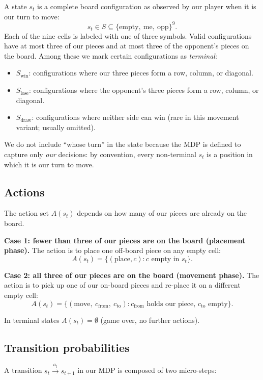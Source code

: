 \documentclass[12pt]{article}
\begin{document}
A state $s_t$ is a complete board configuration as observed by our player when it is our turn to move:
\[
  s_t \in S \subseteq \{\text{empty},\ \text{me},\ \text{opp}\}^9.
\]
Each of the nine cells is labeled with one of three symbols. Valid configurations have at most three of our pieces and at most three of the opponent's pieces on the board. Among these we mark certain configurations as \emph{terminal}:
\begin{itemize}[leftmargin=1.5em,itemsep=1pt]
  \item $S_{\text{win}}$: configurations where our three pieces form a row, column, or diagonal.
  \item $S_{\text{lose}}$: configurations where the opponent's three pieces form a row, column, or diagonal.
  \item $S_{\text{draw}}$: configurations where neither side can win (rare in this movement variant; usually omitted).
\end{itemize}
We do not include ``whose turn'' in the state because the MDP is defined to capture only \emph{our} decisions: by convention, every non-terminal $s_t$ is a position in which it is our turn to move.

\subsection*{Actions}

The action set $A(s_t)$ depends on how many of our pieces are already on the board.

\textbf{Case 1: fewer than three of our pieces are on the board (placement phase).} The action is to place one off-board piece on any empty cell:
\[
  A(s_t) = \{(\text{place}, c) : c \text{ empty in } s_t\}.
\]

\textbf{Case 2: all three of our pieces are on the board (movement phase).} The action is to pick up one of our on-board pieces and re-place it on a different empty cell:
\[
  A(s_t) = \{(\text{move},\ c_{\text{from}},\ c_{\text{to}}) : c_{\text{from}} \text{ holds our piece, } c_{\text{to}} \text{ empty}\}.
\]

In terminal states $A(s_t) = \emptyset$ (game over, no further actions).

\subsection*{Transition probabilities}

A transition $s_t \xrightarrow{a_t} s_{t+1}$ in our MDP is composed of two micro-steps:
\end{document}
